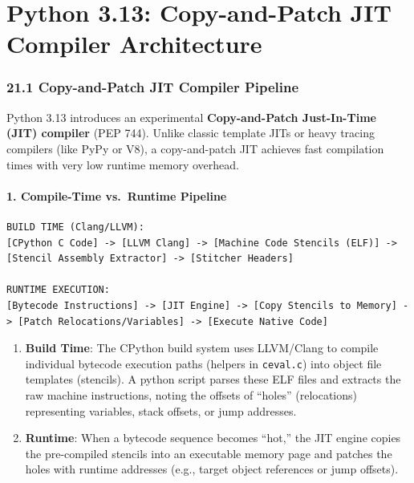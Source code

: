 \hypertarget{python-3.13-copy-and-patch-jit-compiler-architecture}{%
\chapter{Python 3.13: Copy-and-Patch JIT Compiler
Architecture}\label{python-3.13-copy-and-patch-jit-compiler-architecture}}

\hypertarget{copy-and-patch-jit-compiler-pipeline}{%
\subsection{21.1 Copy-and-Patch JIT Compiler
Pipeline}\label{copy-and-patch-jit-compiler-pipeline}}

Python 3.13 introduces an experimental \textbf{Copy-and-Patch
Just-In-Time (JIT) compiler} (PEP 744). Unlike classic template JITs or
heavy tracing compilers (like PyPy or V8), a copy-and-patch JIT achieves
fast compilation times with very low runtime memory overhead.

\hypertarget{compile-time-vs.-runtime-pipeline}{%
\subsubsection{1. Compile-Time vs.~Runtime
Pipeline}\label{compile-time-vs.-runtime-pipeline}}

\begin{lstlisting}
BUILD TIME (Clang/LLVM):
[CPython C Code] -> [LLVM Clang] -> [Machine Code Stencils (ELF)] -> [Stencil Assembly Extractor] -> [Stitcher Headers]

RUNTIME EXECUTION:
[Bytecode Instructions] -> [JIT Engine] -> [Copy Stencils to Memory] -> [Patch Relocations/Variables] -> [Execute Native Code]
\end{lstlisting}

\begin{enumerate}
\def\labelenumi{\arabic{enumi}.}
\tightlist
\item
  \textbf{Build Time}: The CPython build system uses LLVM/Clang to
  compile individual bytecode execution paths (helpers in
  \passthrough{\lstinline!ceval.c!}) into object file templates
  (stencils). A python script parses these ELF files and extracts the
  raw machine instructions, noting the offsets of ``holes''
  (relocations) representing variables, stack offsets, or jump
  addresses.
\item
  \textbf{Runtime}: When a bytecode sequence becomes ``hot,'' the JIT
  engine copies the pre-compiled stencils into an executable memory page
  and patches the holes with runtime addresses (e.g., target object
  references or jump offsets).
\end{enumerate}


